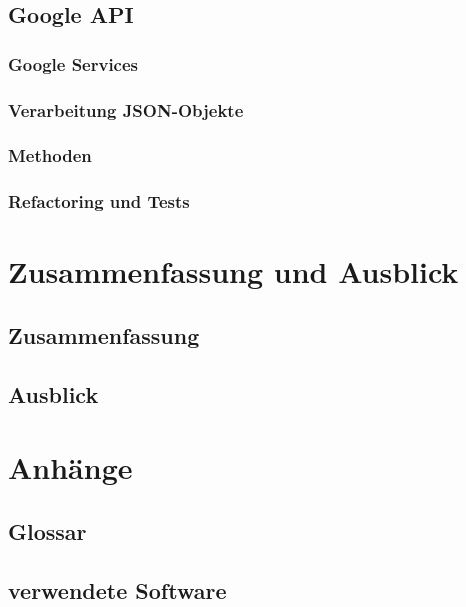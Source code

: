 \documentclass[a4paper, 11pt]{scrreprt}
\begin{document}
\section{Google API}

\subsection{Google Services}

\subsection{Verarbeitung JSON-Objekte}

\subsection{Methoden}

\subsection{Refactoring und Tests}

\chapter{Zusammenfassung und Ausblick}

\section{Zusammenfassung}

\section{Ausblick}

\chapter{Anhänge}

\section{Glossar}

\section{verwendete Software}
\end{document}
